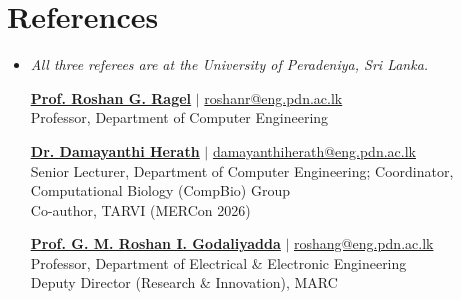 \documentclass[a4paper,10pt]{article}
\newcommand{\resumeSubHeadingListStart}{\begin{itemize}[leftmargin=0.15in, label={}]}
\newcommand{\resumeSubHeadingListEnd}{\end{itemize}}
\begin{document}
\section{\textbf{References}}
\vspace{5pt}
\resumeSubHeadingListStart

\item{
    \small\emph{All three referees are at the University of Peradeniya, Sri Lanka.}
    \\ \vspace{4pt}

    \textbf{\href{https://people.ce.pdn.ac.lk/staff/academic/roshan-ragel/}{\underline{Prof. Roshan G. Ragel}}} $|$ \href{mailto:roshanr@eng.pdn.ac.lk}{roshanr@eng.pdn.ac.lk}
    \\ \vspace{1pt}
    \small{Professor, Department of Computer Engineering}
    \\ \vspace{5pt}

    \textbf{\href{https://people.ce.pdn.ac.lk/staff/academic/damayanthi-herath/}{\underline{Dr. Damayanthi Herath}}}  $|$ \href{mailto:damayanthiherath@eng.pdn.ac.lk}{damayanthiherath@eng.pdn.ac.lk}
    \\ \vspace{1pt}
    \small{Senior Lecturer, Department of Computer Engineering; Coordinator, Computational Biology (CompBio) Group}
    \\ \vspace{1pt}
    \small{Co-author, TARVI (MERCon 2026)}
    \\ \vspace{5pt}

    \textbf{\href{https://roshangodaliyadda888.github.io/}{\underline{Prof. G. M. Roshan I. Godaliyadda}}}  $|$ \href{mailto:roshang@eng.pdn.ac.lk}{roshang@eng.pdn.ac.lk}
    \\ \vspace{1pt}
    \small{Professor, Department of Electrical \& Electronic Engineering}
    \\ \vspace{1pt}
    \small{Deputy Director (Research \& Innovation), MARC}
}

\resumeSubHeadingListEnd
\end{document}
